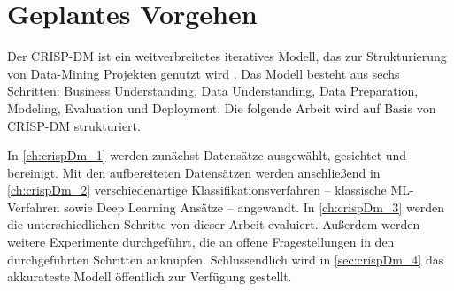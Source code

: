 \section{Geplantes Vorgehen}

Der \ac{CRISP-DM} ist ein weitverbreitetes iteratives Modell, das zur Strukturierung von Data-Mining Projekten genutzt wird \autocite{martinez-plumed_casp-dm_2017, chapman_crisp-dm_2000}. Das Modell besteht aus sechs Schritten: Business Understanding, Data Understanding, Data Preparation, Modeling, Evaluation und Deployment. Die folgende Arbeit wird auf Basis von \ac{CRISP-DM} strukturiert.

In \autoref{ch:crispDm_1} werden zunächst Datensätze ausgewählt, gesichtet und bereinigt. Mit den aufbereiteten Datensätzen werden anschließend in \autoref{ch:crispDm_2} verschiedenartige Klassifikationsverfahren -- klassische \ac{ML}-Verfahren sowie Deep Learning Ansätze -- angewandt. In \autoref{ch:crispDm_3} werden die unterschiedlichen Schritte von dieser Arbeit evaluiert. Außerdem werden weitere Experimente durchgeführt, die an offene Fragestellungen in den durchgeführten Schritten anknüpfen. Schlussendlich wird in \autoref{sec:crispDm_4} das akkurateste Modell öffentlich zur Verfügung gestellt.
